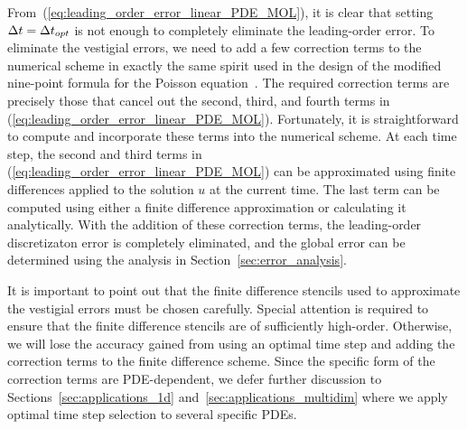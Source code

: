 \documentclass[oneeqnum,onefignum,onetabnum,onethmnum]{siamltex}
\begin{document}
From~(\ref{eq:leading_order_error_linear_PDE_MOL}), it is clear that setting 
$\Delta t = \Delta t_{opt}$ is not enough to completely eliminate the 
leading-order error.  To eliminate the vestigial errors, we need to add a few 
correction terms to the numerical scheme in exactly the same spirit used in 
the design of the modified nine-point formula for the Poisson 
equation~\cite{iserles_book}.  The required correction terms are precisely 
those that cancel out the second, third, and fourth terms in 
(\ref{eq:leading_order_error_linear_PDE_MOL}).  Fortunately, it is 
straightforward to compute and incorporate these terms into the numerical 
scheme.  At each time step, the second and third terms in 
(\ref{eq:leading_order_error_linear_PDE_MOL}) can be approximated using
finite differences applied to the solution $u$ at the current time.
The last term can be computed using either a finite difference approximation 
or calculating it analytically.  With the addition of these correction terms, 
the leading-order discretizaton error is completely eliminated, and the
global error can be determined using the analysis in 
Section~\ref{sec:error_analysis}.

It is important to point out that the finite difference stencils used to 
approximate the vestigial errors must be chosen carefully.  Special attention 
is required to ensure that the finite difference stencils are of sufficiently 
high-order.  Otherwise, we will lose the accuracy gained from using an optimal 
time step and adding the correction terms to the finite difference scheme.  
Since the specific form of the correction terms are PDE-dependent, we defer 
further discussion to Sections~\ref{sec:applications_1d} 
and~\ref{sec:applications_multidim} where we apply optimal time step selection 
to several specific PDEs.
\end{document}
